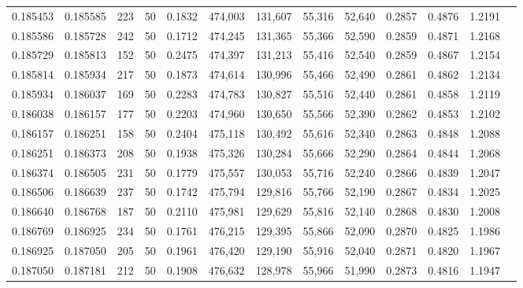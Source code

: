 \begin{tabular}{rrrrrrrrrrrrr}
0.185453 & 0.185585 &   223 &  50 &                                     0.1832 & 474,003 & 131,607 &  55,316 &  52,640 & 0.2857 & 0.4876 & 1.2191 \\
0.185586 & 0.185728 &   242 &  50 &                                     0.1712 & 474,245 & 131,365 &  55,366 &  52,590 & 0.2859 & 0.4871 & 1.2168 \\
0.185729 & 0.185813 &   152 &  50 &                                     0.2475 & 474,397 & 131,213 &  55,416 &  52,540 & 0.2859 & 0.4867 & 1.2154 \\
0.185814 & 0.185934 &   217 &  50 &                                     0.1873 & 474,614 & 130,996 &  55,466 &  52,490 & 0.2861 & 0.4862 & 1.2134 \\
0.185934 & 0.186037 &   169 &  50 &                                     0.2283 & 474,783 & 130,827 &  55,516 &  52,440 & 0.2861 & 0.4858 & 1.2119 \\
0.186038 & 0.186157 &   177 &  50 &                                     0.2203 & 474,960 & 130,650 &  55,566 &  52,390 & 0.2862 & 0.4853 & 1.2102 \\
0.186157 & 0.186251 &   158 &  50 &                                     0.2404 & 475,118 & 130,492 &  55,616 &  52,340 & 0.2863 & 0.4848 & 1.2088 \\
0.186251 & 0.186373 &   208 &  50 &                                     0.1938 & 475,326 & 130,284 &  55,666 &  52,290 & 0.2864 & 0.4844 & 1.2068 \\
0.186374 & 0.186505 &   231 &  50 &                                     0.1779 & 475,557 & 130,053 &  55,716 &  52,240 & 0.2866 & 0.4839 & 1.2047 \\
0.186506 & 0.186639 &   237 &  50 &                                     0.1742 & 475,794 & 129,816 &  55,766 &  52,190 & 0.2867 & 0.4834 & 1.2025 \\
0.186640 & 0.186768 &   187 &  50 &                                     0.2110 & 475,981 & 129,629 &  55,816 &  52,140 & 0.2868 & 0.4830 & 1.2008 \\
0.186769 & 0.186925 &   234 &  50 &                                     0.1761 & 476,215 & 129,395 &  55,866 &  52,090 & 0.2870 & 0.4825 & 1.1986 \\
0.186925 & 0.187050 &   205 &  50 &                                     0.1961 & 476,420 & 129,190 &  55,916 &  52,040 & 0.2871 & 0.4820 & 1.1967 \\
0.187050 & 0.187181 &   212 &  50 &                                     0.1908 & 476,632 & 128,978 &  55,966 &  51,990 & 0.2873 & 0.4816 & 1.1947 \\

\end{tabular}
